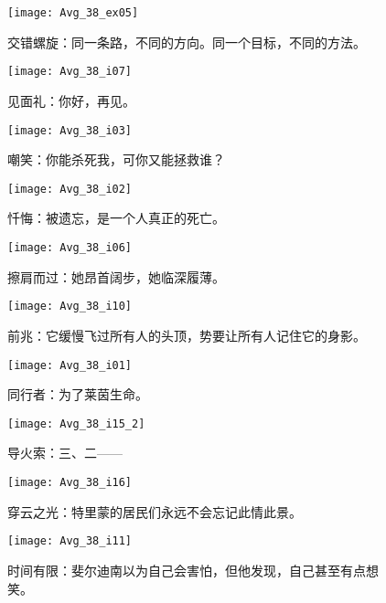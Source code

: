 \documentclass[openany]{book}
\begin{document}
\begin{figure}[h]
    \caption*{交错螺旋：同一条路，不同的方向。同一个目标，不同的方法。}
    \centering
    \texttt{[image: Avg\_38\_ex05]}
\end{figure}

\begin{figure}[h]
    \caption*{见面礼：你好，再见。}
    \centering
    \texttt{[image: Avg\_38\_i07]}
\end{figure}

\begin{figure}[h]
    \caption*{嘲笑：你能杀死我，可你又能拯救谁？}
    \centering
    \texttt{[image: Avg\_38\_i03]}
\end{figure}

\begin{figure}[h]
    \caption*{忏悔：被遗忘，是一个人真正的死亡。}
    \centering
    \texttt{[image: Avg\_38\_i02]}
\end{figure}

\begin{figure}[h]
    \caption*{擦肩而过：她昂首阔步，她临深履薄。}
    \centering
    \texttt{[image: Avg\_38\_i06]}
\end{figure}

\begin{figure}[h]
    \caption*{前兆：它缓慢飞过所有人的头顶，势要让所有人记住它的身影。}
    \centering
    \texttt{[image: Avg\_38\_i10]}
\end{figure}

\begin{figure}[h]
    \caption*{同行者：为了莱茵生命。}
    \centering
    \texttt{[image: Avg\_38\_i01]}
\end{figure}

\begin{figure}[h]
    \caption*{导火索：三、二——}
    \centering
    \texttt{[image: Avg\_38\_i15\_2]}
\end{figure}

\begin{figure}[h]
    \caption*{穿云之光：特里蒙的居民们永远不会忘记此情此景。}
    \centering
    \texttt{[image: Avg\_38\_i16]}
\end{figure}

\begin{figure}[h]
    \caption*{时间有限：斐尔迪南以为自己会害怕，但他发现，自己甚至有点想笑。}
    \centering
    \texttt{[image: Avg\_38\_i11]}
\end{figure}
\end{document}
